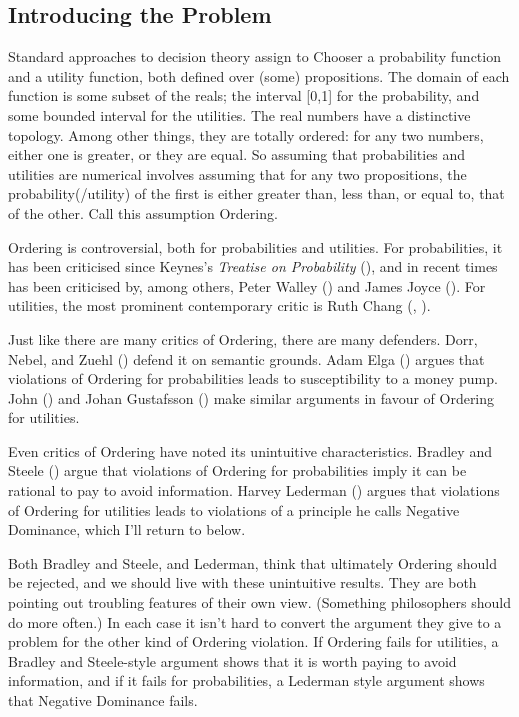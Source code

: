 \documentclass[
  10pt,
  letterpaper,
  DIV=11,
  numbers=noendperiod,
  twoside]{scrartcl}
\begin{document}
\subsection{Introducing the Problem}\label{sec-ordering-intro}

Standard approaches to decision theory assign to Chooser a probability
function and a utility function, both defined over (some) propositions.
The domain of each function is some subset of the reals; the interval
{[}0,1{]} for the probability, and some bounded interval for the
utilities. The real numbers have a distinctive topology. Among other
things, they are totally ordered: for any two numbers, either one is
greater, or they are equal. So assuming that probabilities and utilities
are numerical involves assuming that for any two propositions, the
probability(/utility) of the first is either greater than, less than, or
equal to, that of the other. Call this assumption Ordering.

Ordering is controversial, both for probabilities and utilities. For
probabilities, it has been criticised since Keynes's \emph{Treatise on
Probability} (), and in recent times has
been criticised by, among others, Peter Walley
() and James Joyce
(). For utilities, the most prominent
contemporary critic is Ruth Chang (,
).

Just like there are many critics of Ordering, there are many defenders.
Dorr, Nebel, and Zuehl () defend it on
semantic grounds. Adam Elga () argues that
violations of Ordering for probabilities leads to susceptibility to a
money pump. John () and
Johan Gustafsson () make similar
arguments in favour of Ordering for utilities.

Even critics of Ordering have noted its unintuitive characteristics.
Bradley and Steele () argue that
violations of Ordering for probabilities imply it can be rational to pay
to avoid information. Harvey Lederman ()
argues that violations of Ordering for utilities leads to violations of
a principle he calls Negative Dominance, which I'll return to below.

Both Bradley and Steele, and Lederman, think that ultimately Ordering
should be rejected, and we should live with these unintuitive results.
They are both pointing out troubling features of their own view.
(Something philosophers should do more often.) In each case it isn't
hard to convert the argument they give to a problem for the other kind
of Ordering violation. If Ordering fails for utilities, a Bradley and
Steele-style argument shows that it is worth paying to avoid
information, and if it fails for probabilities, a Lederman style
argument shows that Negative Dominance fails.
\end{document}
